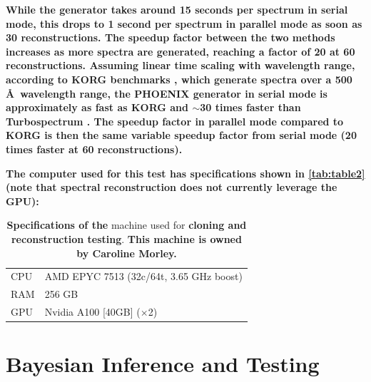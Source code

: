 \documentclass[twocolumn, linenumbers]{aastex631}
\begin{document}
\textbf{While the generator takes around 15 seconds per spectrum in serial mode, this drops to 1 second per spectrum in parallel mode as soon as 30 reconstructions.
The speedup factor between the two methods increases as more spectra are generated, reaching a factor of 20 at 60 reconstructions.
Assuming linear time scaling with wavelength range, according to KORG benchmarks \citep{korg}, which generate spectra over a 500 \AA \ wavelength range, the PHOENIX generator in serial mode is approximately as fast as KORG and $\sim$30 times faster than Turbospectrum \citep{turbospectrum}.
The speedup factor in parallel mode compared to KORG is then the same variable speedup factor from serial mode (20 times faster at 60 reconstructions).}

\textbf{The computer used for this test has specifications shown in \autoref{tab:table2} (note that spectral reconstruction does not currently leverage the GPU):}
\begin{table}[h!]
    \centering
    \begin{tabular}{ll}
        \hline
        CPU & AMD EPYC 7513 (32c/64t, 3.65 GHz boost)\\
        RAM & 256 GB\\
        GPU & Nvidia A100 [40GB] ($\times$2)\\
        \hline
    \end{tabular}
    \caption{\textbf{Specifications of the} machine used for \textbf{cloning and reconstruction testing}.
    \textbf{This machine is owned by Caroline Morley.}}
    \label{tab:table2}
\end{table}

\section{Bayesian Inference and Testing}
\label{sec:section4}
\end{document}
